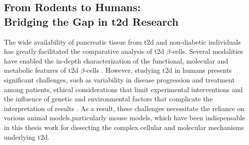 \clearpage


\subsection[From Rodents to Humans: Bridging the Gap in \glsentryshort{t2d} Research]{From Rodents to Humans:\\Bridging the Gap in \gls{t2d} Research}
\vspace{20pt}
\par The wide availability of pancreatic tissue from \gls{t2d} and non-diabetic individuals has greatly facilitated the comparative analysis of \gls{t2d} $\beta$-cells. Several modalities have enabled the in-depth characterization of  the functional, molecular and metabolic features of \gls{t2d} $\beta$-cells \textbf{\cite{avrahami_single-cell_2020,camunas-soler_patch-seq_2020,cohrs_dysfunction_2020,wigger_multi-omics_2021,gloyn_every_2022}}. However, studying \gls{t2d} in humans presents significant challenges, such as variability in disease progression and treatment among patients, ethical considerations that limit experimental interventions and the influence of genetic and environmental factors that complicate the interpretation of results \textbf{\cite{haga_ethical_2009,prasad_genetics_2015}}. As a result, these challenges necessitate the reliance on various animal models,particularly mouse models, which have been indispensable in this thesis work for dissecting the complex cellular and molecular mechanisms underlying \gls{t2d}.\\


